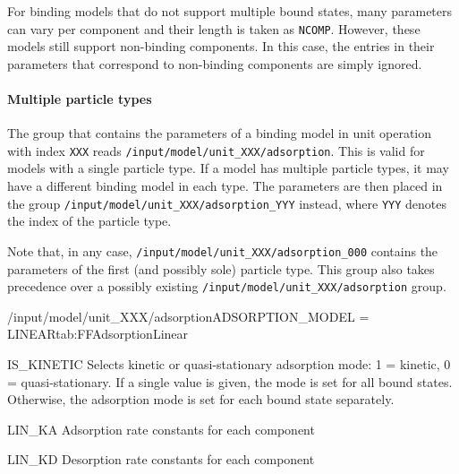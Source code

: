 For binding models that do not support multiple bound states, many parameters can vary per component and their length is taken as \texttt{NCOMP}.
However, these models still support non-binding components.
In this case, the entries in their parameters that correspond to non-binding components are simply ignored.

\paragraph{Multiple particle types}

The group that contains the parameters of a binding model in unit operation with index \texttt{XXX} reads \texttt{/input/model/unit\_XXX/adsorption}.
This is valid for models with a single particle type.
If a model has multiple particle types, it may have a different binding model in each type.
The parameters are then placed in the group \texttt{/input/model/unit\_XXX/adsorption\_YYY} instead, where \texttt{YYY} denotes the index of the particle type.

Note that, in any case, \texttt{/input/model/unit\_XXX/adsorption\_000} contains the parameters of the first (and possibly sole) particle type.
This group also takes precedence over a possibly existing \texttt{/input/model/unit\_XXX/adsorption} group.

\begin{condsubgroup}{/input/model/unit\_XXX/adsorption}{ADSORPTION\_MODEL = LINEAR}{tab:FFAdsorptionLinear}
  \begin{dataset}[type=int,range={$\{ 0,1 \}$},length={1 / \texttt{NTOTALBND}}]{IS\_KINETIC}
    Selects kinetic or quasi-stationary adsorption mode: 1 = kinetic, 0 = quasi-stationary.
    If a single value is given, the mode is set for all bound states.
    Otherwise, the adsorption mode is set for each bound state separately.
  \end{dataset}
  \begin{dataset}[unit=\si{\cubic\metre\of{MP}\per\cubic\metre\of{SP}\per\second},type=double,range={$\geq 0$},length={\texttt{NCOMP}}]{LIN\_KA}
    Adsorption rate constants for each component
  \end{dataset}
  \begin{dataset}[unit=\si{\per\second},type=double,range={$\geq 0$},length={\texttt{NCOMP}}]{LIN\_KD}
    Desorption rate constants for each component
  \end{dataset}
\end{condsubgroup}

